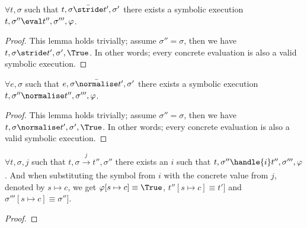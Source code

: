 \begin{lemma}
  $\forall t,\sigma$ such that $t,\sigma \bar{\stride}t',\sigma'$
  there exists a symbolic execution $t,\sigma''\eval t'',\sigma''',\phi$.
\end{lemma}

\begin{proof}
This lemma holds trivially; assume $\sigma''=\sigma$, then we have $t,\sigma\stride t',\sigma',\True$.
In other words; every concrete evaluation is also a valid symbolic execution.
\end{proof}

\begin{lemma}
  $\forall e,\sigma$ such that $e,\sigma \bar{\normalise}t',\sigma'$
  there exists a symbolic execution $t,\sigma''\normalise t'',\sigma''',\phi$.
\end{lemma}

\begin{proof}
This lemma holds trivially; assume $\sigma''=\sigma$, then we have $t,\sigma\normalise t',\sigma',\True$.
In other words; every concrete evaluation is also a valid symbolic execution.
\end{proof}

\begin{lemma}
  $\forall t,\sigma,j$ such that $t,\sigma \xrightarrow[]{j} t'',\sigma''$
  there exists an $i$ such that $t,\sigma''\handle{i} t'',\sigma''',\phi$. And when substituting the symbol from $i$ with the concrete value from $j$, denoted by $s\mapsto c$, we get $\phi[s\mapsto c]\equiv\True$, $t''[s\mapsto c]\equiv t']$ and $\sigma'''[s\mapsto c]\equiv\sigma'']$.
\end{lemma}

\begin{proof}
\end{proof}

\begin{lemma}
\end{lemma}
